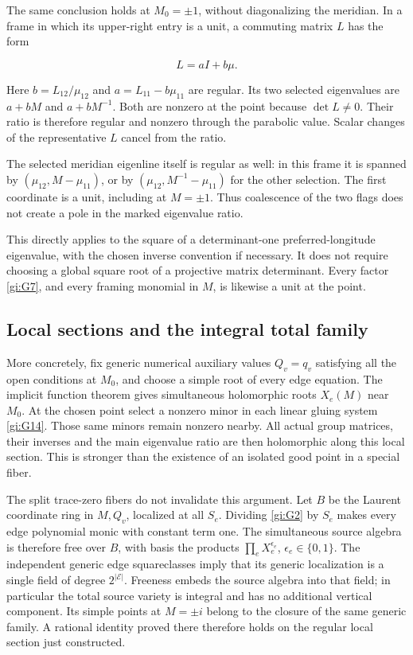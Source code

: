 The same conclusion holds at \(M_0=\pm1\), without
diagonalizing the meridian. In a frame in which its
upper-right entry is a unit, a commuting matrix \(L\) has
the form

\begin{equation}\label{gi:G17}
L=aI+b\mu.
\end{equation}

Here \(b=L_{12}/\mu_{12}\) and
\(a=L_{11}-b\mu_{11}\) are regular. Its two selected
eigenvalues are \(a+bM\) and \(a+bM^{-1}\). Both are
nonzero at the point because \(\det L\ne0\).
Their ratio is therefore regular and nonzero through the
parabolic value. Scalar changes of the representative \(L\)
cancel from the ratio.

The selected meridian eigenline itself is regular as well:
in this frame it is spanned by
\((\mu_{12},M-\mu_{11})\), or by
\((\mu_{12},M^{-1}-\mu_{11})\) for the other selection.
The first coordinate is a unit, including at \(M=\pm1\).
Thus coalescence of the two flags does not create a pole in
the marked eigenvalue ratio.

This directly applies to the square of a determinant-one
preferred-longitude eigenvalue, with the chosen inverse
convention if necessary. It does not require choosing a
global square root of a projective matrix determinant.
Every factor \eqref{gi:G7}, and every framing monomial in \(M\),
is likewise a unit at the point.

\subsection{Local sections and the integral total family}\label{gi:local-sections-and-the-integral-total-family}

More concretely, fix generic numerical auxiliary values
\(Q_v=q_v\) satisfying all the open conditions at \(M_0\),
and choose a simple root of every edge equation. The implicit
function theorem gives simultaneous holomorphic roots
\(X_e(M)\) near \(M_0\). At the chosen point select a
nonzero minor in each linear gluing system \eqref{gi:G14}. Those same
minors remain nonzero nearby. All actual group matrices,
their inverses and the main eigenvalue ratio are then
holomorphic along this local section. This is stronger than
the existence of an isolated good point in a special fiber.

The split trace-zero fibers do not invalidate this argument.
Let \(B\) be the Laurent coordinate ring in \(M,Q_v\),
localized at all \(S_e\). Dividing \eqref{gi:G2} by \(S_e\) makes
every edge polynomial monic with constant term one. The
simultaneous source algebra is therefore free over \(B\),
with basis the products \(\prod_e X_e^{\epsilon_e}\),
\(\epsilon_e\in\{0,1\}\). The independent generic edge
squareclasses imply that its generic localization is a
single field of degree \(2^{|\mathcal E|}\). Freeness embeds the
source algebra into that field; in particular the total
source variety is integral and has no additional vertical
component. Its simple points at \(M=\pm i\) belong to
the closure of the same generic family. A rational identity
proved there therefore holds on the regular local section
just constructed.

